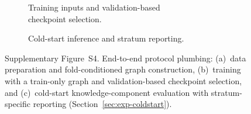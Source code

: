 \documentclass[pdflatex,sn-mathphys-num]{sn-jnl}
\begin{document}
\begin{figure}[!t]
\begin{subfigure}[t]{0.36\linewidth}
\begin{tikzpicture}
\end{tikzpicture}
\caption{Training inputs and validation-based\\
checkpoint selection.}
\label{fig:pipe-train}
\end{subfigure}\hfill
\begin{subfigure}[t]{0.28\linewidth}
\centering
{}
\caption{Cold-start inference and stratum reporting.}
\label{fig:pipe-infer}
\end{subfigure}
\caption{Supplementary Figure~S4. End-to-end protocol plumbing: (a)~data
preparation and fold-conditioned graph construction, (b)~training with a
train-only graph and validation-based checkpoint selection, and
(c)~cold-start knowledge-component evaluation with \mbox{stratum-specific}
reporting (Section~\ref{sec:exp-coldstart}).}
\label{fig:pipelines}
\end{figure}
\end{document}
